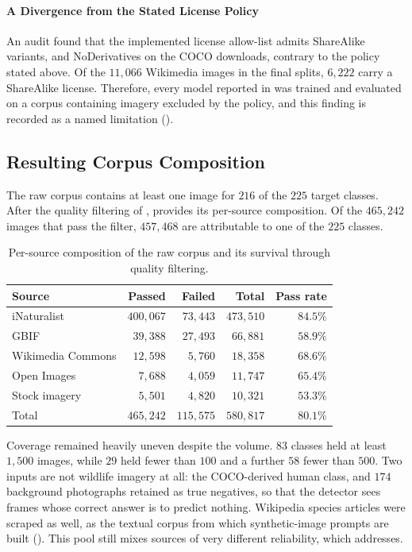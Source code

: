 \paragraph{A Divergence from the Stated License Policy}
An audit found that the implemented license allow-list admits ShareAlike variants, and NoDerivatives on the COCO downloads, contrary to the policy stated above. Of the $11{,}066$ Wikimedia images in the final splits, $6{,}222$ carry a ShareAlike license. Therefore, every model reported in  was trained and evaluated on a corpus containing imagery excluded by the policy, and this finding is recorded as a named limitation ().

\subsection{Resulting Corpus Composition}\label{sec:corpus_composition}

The raw corpus contains at least one image for $216$ of the $225$ target classes. After the quality filtering of ,  provides its per-source composition. Of the $465{,}242$ images that pass the filter, $457{,}468$ are attributable to one of the $225$ classes.

\begin{table}[htbp]
\centering
\caption{Per-source composition of the raw corpus and its survival through quality filtering.}
\label{tab:source-funnel}
\begin{tabular}{@{}lrrrr@{}}
\toprule
Source & Passed & Failed & Total & Pass rate \\
\midrule
iNaturalist & $400{,}067$ & $73{,}443$ & $473{,}510$ & $84.5\%$ \\
GBIF & $39{,}388$ & $27{,}493$ & $66{,}881$ & $58.9\%$ \\
Wikimedia Commons & $12{,}598$ & $5{,}760$ & $18{,}358$ & $68.6\%$ \\
Open Images & $7{,}688$ & $4{,}059$ & $11{,}747$ & $65.4\%$ \\
Stock imagery & $5{,}501$ & $4{,}820$ & $10{,}321$ & $53.3\%$ \\
\midrule
Total & $465{,}242$ & $115{,}575$ & $580{,}817$ & $80.1\%$ \\
\bottomrule
\end{tabular}
\end{table}

Coverage remained heavily uneven despite the volume. $83$ classes held at least $1{,}500$ images, while $29$ held fewer than $100$ and a further $58$ fewer than $500$. Two inputs are not wildlife imagery at all: the COCO-derived human class, and $174$ background photographs retained as true negatives, so that the detector sees frames whose correct answer is to predict nothing. Wikipedia species articles were scraped as well, as the textual corpus from which synthetic-image prompts are built (). This pool still mixes sources of very different reliability, which  addresses.
